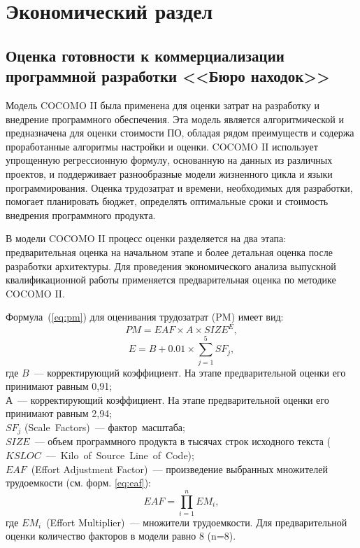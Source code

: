 \section{Экономический раздел}
\label{sec:economy}

\subsection{Оценка готовности к коммерциализации программной разработки <<Бюро находок>>}

Модель COCOMO II была применена для оценки затрат на разработку и внедрение программного обеспечения. Эта модель является алгоритмической и предназначена для оценки стоимости ПО, обладая рядом преимуществ и содержа проработанные алгоритмы настройки и оценки. COCOMO II использует упрощенную регрессионную формулу, основанную на данных из различных проектов, и поддерживает разнообразные модели жизненного цикла и языки программирования. Оценка трудозатрат и времени, необходимых для разработки, помогает планировать бюджет, определять оптимальные сроки и стоимость внедрения программного продукта.

В модели COCOMO II процесс оценки разделяется на два этапа: предварительная оценка на начальном этапе и более детальная оценка после разработки архитектуры. Для проведения экономического анализа выпускной квалификационной работы применяется предварительная оценка по методике COCOMO II.

Формула~(\ref{eq:pm}) для оценивания трудозатрат (PM) имеет вид:
\begin{equation}\label{eq:pm}
	PM = EAF \times A \times SIZE^E,
\end{equation}
\begin{equation}\label{eq:e}
	E = B + 0.01 \times \sum_{j=1}^{5}SF_j,
\end{equation}
где $B$~--- корректирующий коэффициент. На этапе предварительной оценки его принимают равным 0,91; \\
$А$~--- корректирующий коэффициент. На этапе предварительной оценки его принимают равным 2,94; \\
$SF_j$ (Scale Factors)~--- фактор масштаба; \\
$SIZE$~--– объем программного продукта в тысячах строк исходного текста ($KSLOC$~--- Kilo of Source Line of Code); \\
$EAF$ (Effort Adjustment Factor)~--– произведение выбранных множителей трудоемкости (см. форм. \ref{eq:eaf}):
\begin{equation}\label{eq:eaf}
	EAF = \prod_{i = 1}^{n}EM_i,
\end{equation}
где $EM_i$ (Effort Multiplier)~--- множители трудоемкости. Для предварительной оценки количество факторов в модели равно 8 (n=8). 

